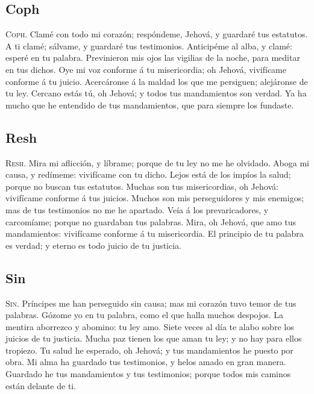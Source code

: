 \hypertarget{coph}{%
\subsection{Coph}\label{coph}}

 \textsc{Coph}. Clamé con todo mi corazón; respóndeme,
Jehová, y guardaré tus estatutos.  A ti clamé; sálvame,
y guardaré tus testimonios.  Anticipéme al alba, y
clamé: esperé en tu palabra.  Previnieron mis ojos las
vigilias de la noche, para meditar en tus dichos.  Oye
mi voz conforme á tu misericordia; oh Jehová, vivifícame conforme á tu
juicio.  Acercáronse á la maldad los que me persiguen;
alejáronse de tu ley.  Cercano estás tú, oh Jehová; y
todos tus mandamientos son verdad.  Ya ha mucho que he
entendido de tus mandamientos, que para siempre los fundaste.

\hypertarget{resh}{%
\subsection{Resh}\label{resh}}

 \textsc{Resh}. Mira mi aflicción, y líbrame; porque de
tu ley no me he olvidado.  Aboga mi causa, y redímeme:
vivifícame con tu dicho.  Lejos está de los impíos la
salud; porque no buscan tus estatutos.  Muchas son tus
misericordias, oh Jehová: vivifícame conforme á tus juicios.
 Muchos son mis perseguidores y mis enemigos; mas de tus
testimonios no me he apartado.  Veía á los
prevaricadores, y carcomíame; porque no guardaban tus palabras.
 Mira, oh Jehová, que amo tus mandamientos: vivifícame
conforme á tu misericordia.  El principio de tu palabra
es verdad; y eterno es todo juicio de tu justicia.

\hypertarget{sin}{%
\subsection{Sin}\label{sin}}

 \textsc{Sin}. Príncipes me han perseguido sin causa;
mas mi corazón tuvo temor de tus palabras.  Gózome yo en
tu palabra, como el que halla muchos despojos.  La
mentira aborrezco y abomino: tu ley amo.  Siete veces al
día te alabo sobre los juicios de tu justicia.  Mucha
paz tienen los que aman tu ley; y no hay para ellos tropiezo.
 Tu salud he esperado, oh Jehová; y tus mandamientos he
puesto por obra.  Mi alma ha guardado tus testimonios, y
helos amado en gran manera.  Guardado he tus
mandamientos y tus testimonios; porque todos mis caminos están delante
de ti.

